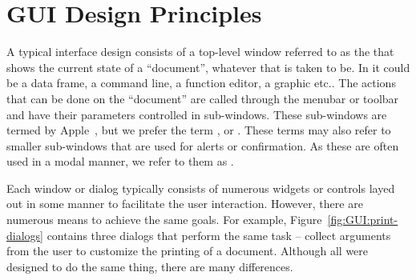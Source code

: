\section{GUI Design Principles}
\label{sec:GUI:design}










A typical interface design
consists of a top-level window referred to as the
 that shows the current state of a
``document'', whatever that is taken to be. In \R\/ it could be a data
frame, a command line, a function editor, a graphic etc.. The actions
that can be done on the ``document'' are called through the menubar or
toolbar and have their parameters controlled in sub-windows. These
sub-windows are termed  by
Apple~\citep{APPLE:HIG}, but we prefer the term , or
. These terms may also refer to smaller
sub-windows that are used for alerts or confirmation. As these are
often used in a modal manner, we refer to them as .

Each window or dialog typically consists of numerous widgets or
controls layed out in some manner to facilitate the user
interaction. However, there are numerous means to achieve the same
goals. For example, Figure~\ref{fig:GUI:print-dialogs} contains three
dialogs that perform the same task -- collect arguments from the user
to customize the printing of a document. Although all were designed to
do the same thing, there are many differences.

